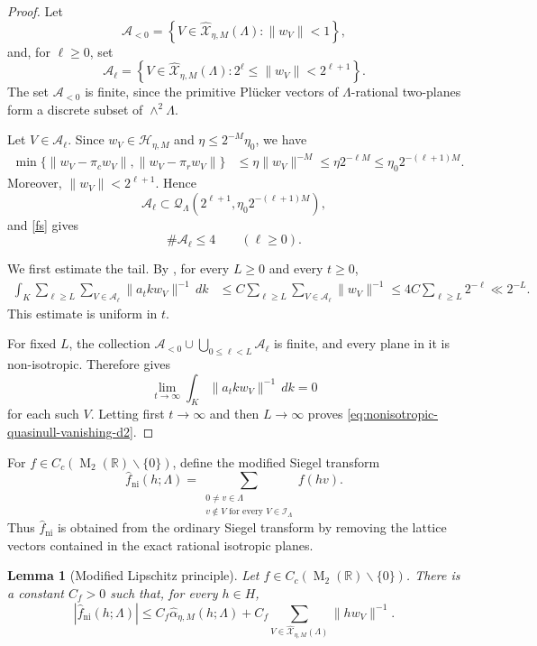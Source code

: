 \documentclass[reqno,11pt]{amsart}
\newtheorem{lem}[lem]{Lemma}
\theoremstyle{definition}
\theoremstyle{remark}
\numberwithin{equation}{section}
\newcommand{\M}{\operatorname{M}}
\begin{document}
\begin{proof}
Let
$$
\mathcal A_{<0}
=
\left\{
V\in\widehat{\mathcal X}_{\eta,M}(\Lambda):
\|w_V\|<1
\right\},
$$
and, for $\ell\ge0$, set
$$
\mathcal A_\ell
=
\left\{
V\in\widehat{\mathcal X}_{\eta,M}(\Lambda):
2^\ell\le\|w_V\|<2^{\ell+1}
\right\}.
$$
The set $\mathcal A_{<0}$ is finite, since the primitive Pl\"ucker
vectors of $\Lambda$-rational two-planes form a discrete subset of
$\wedge^2\Lambda$.

Let $V\in\mathcal A_\ell$. Since
$w_V\in\mathcal H_{\eta,M}$ and
$\eta\le2^{-M}\eta_0$, we have
$$
\begin{aligned}
\min\{\|w_V-\pi_cw_V\|,\|w_V-\pi_rw_V\|\}
&\le
\eta\|w_V\|^{-M} \le
\eta 2^{-\ell M} \le
\eta_0 2^{-(\ell+1)M}.
\end{aligned}
$$
Moreover, $\|w_V\|<2^{\ell+1}$. Hence
$$
\mathcal A_\ell
\subset
\mathcal Q_\Lambda
\left(
2^{\ell+1},
\eta_0 2^{-(\ell+1)M}
\right),
$$
and \eqref{fs} gives
$$
\#\mathcal A_\ell\le4
\qquad
(\ell\ge0).
$$

We first estimate the tail. By
, for every $L\ge0$ and every $t\ge0$,
$$
\begin{aligned}
\int_K
\sum_{\ell\ge L}
\sum_{V\in\mathcal A_\ell}
\|a_tkw_V\|^{-1}\,dk
&\le
C
\sum_{\ell\ge L}
\sum_{V\in\mathcal A_\ell}
\|w_V\|^{-1} \le
4C\sum_{\ell\ge L}2^{-\ell}
\ll
2^{-L}.
\end{aligned}
$$
This estimate is uniform in $t$.

For fixed $L$, the collection
$
\mathcal A_{<0}
\cup
\bigcup_{0\le\ell<L}\mathcal A_\ell
$
is finite, and every plane in it is non-isotropic. Therefore
 gives
$$
\lim_{t\to\infty}
\int_K\|a_tkw_V\|^{-1}\,dk
=
0
$$
for each such $V$. Letting first $t\to\infty$ and then $L\to\infty$
proves \eqref{eq:nonisotropic-quasinull-vanishing-d2}.
\end{proof}

For $f\in C_c(\M_2(\mathbb R)\smallsetminus\{0\})$, define the modified Siegel transform
$$
\widehat f_{\operatorname{ni}}(h;\Lambda)
=
\sum_{\substack{0\ne v\in\Lambda\\
v\notin V\text{ for every }V\in\mathcal I_\Lambda}}
f(hv).
$$
Thus $\widehat f_{\operatorname{ni}}$ is obtained from the ordinary Siegel
transform by removing the lattice vectors contained in the exact rational
isotropic planes.

\begin{lem}[Modified Lipschitz principle]
\label{lem:siegel-height-d2}
Let $f\in C_c(\M_2(\mathbb R)\smallsetminus\{0\})$. There is a constant $C_f>0$ such that,
for every $h\in H$,
\begin{equation}\label{eq:exact-transform-domination-d2}
|\widehat f_{\operatorname{ni}}(h;\Lambda)|
\le
C_f\widehat\alpha_{\eta,M}(h;\Lambda)
+
C_f
\sum_{V\in\widehat{\mathcal X}_{\eta,M}(\Lambda)}
\|hw_V\|^{-1}.
\end{equation}
\end{lem}
\end{document}
